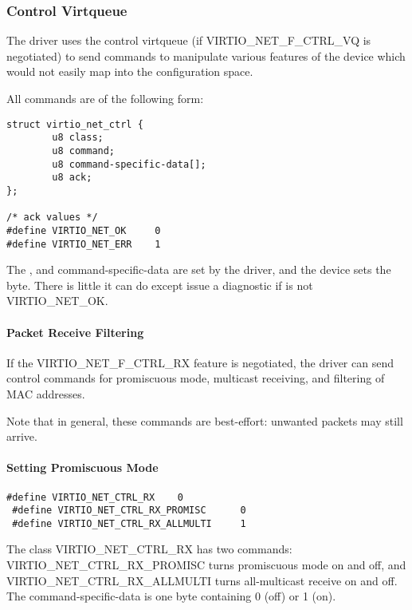 \subsubsection{Control Virtqueue}\label{sec:Device Types / Network Device / Device Operation / Control Virtqueue}

The driver uses the control virtqueue (if VIRTIO_NET_F_CTRL_VQ is
negotiated) to send commands to manipulate various features of
the device which would not easily map into the configuration
space.

All commands are of the following form:

\begin{lstlisting}
struct virtio_net_ctrl {
        u8 class;
        u8 command;
        u8 command-specific-data[];
        u8 ack;
};

/* ack values */
#define VIRTIO_NET_OK     0
#define VIRTIO_NET_ERR    1
\end{lstlisting}

The ,  and command-specific-data are set by the
driver, and the device sets the  byte. There is little it can
do except issue a diagnostic if  is not
VIRTIO_NET_OK.

\paragraph{Packet Receive Filtering}\label{sec:Device Types / Network Device / Device Operation / Control Virtqueue / Packet Receive Filtering}

If the VIRTIO_NET_F_CTRL_RX feature is negotiated, the driver can
send control commands for promiscuous mode, multicast receiving,
and filtering of MAC addresses.

Note that in general, these commands are best-effort: unwanted
packets may still arrive.

\paragraph{Setting Promiscuous Mode}\label{sec:Device Types / Network Device / Device Operation / Control Virtqueue / Setting Promiscuous Mode}

\begin{lstlisting}
#define VIRTIO_NET_CTRL_RX    0
 #define VIRTIO_NET_CTRL_RX_PROMISC      0
 #define VIRTIO_NET_CTRL_RX_ALLMULTI     1
\end{lstlisting}

The class VIRTIO_NET_CTRL_RX has two commands:
VIRTIO_NET_CTRL_RX_PROMISC turns promiscuous mode on and off, and
VIRTIO_NET_CTRL_RX_ALLMULTI turns all-multicast receive on and
off. The command-specific-data is one byte containing 0 (off) or
1 (on).

